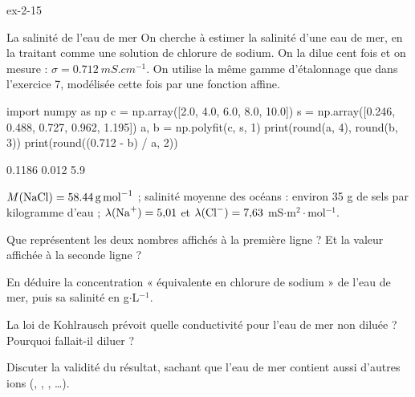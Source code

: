 \begin{blocLivre}{ex-2-15}
\begin{exercice}[3]{La salinité de l'eau de mer}
On cherche à estimer la salinité d'une eau de mer, en la traitant comme une solution de chlorure de sodium.
On la dilue cent fois et on mesure : $\sigma=\qty{0,712}{mS.cm^{-1}}$. On utilise la même gamme d'étalonnage que
dans l'exercice 7, modélisée cette fois par une fonction affine.
\begin{codecote}[0.68]
\begin{pythoncol}
import numpy as np
c = np.array([2.0, 4.0, 6.0, 8.0, 10.0])
s = np.array([0.246, 0.488, 0.727, 0.962, 1.195])
a, b = np.polyfit(c, s, 1)
print(round(a, 4), round(b, 3))
print(round((0.712 - b) / a, 2))
\end{pythoncol}
\cote
\begin{consolecol}
0.1186 0.012
5.9
\end{consolecol}
\end{codecote}
\begin{donnees}
$M(\ce{NaCl})=\qty{58,44}{g.mol^{-1}}$ ; salinité moyenne des océans : environ 35 g de sels par kilogramme d'eau ;
$\lambda(\ce{Na+})=5{,}01$ et $\lambda(\ce{Cl-})=7{,}63$ mS$\cdot$m$^2\cdot$mol$^{-1}$.
\end{donnees}
\begin{questions}
\item {}Que représentent les deux nombres affichés à la première ligne ? Et la valeur
affichée à la seconde ligne ?
\item En déduire la concentration « équivalente en chlorure de sodium » de l'eau de mer, puis sa salinité en g$\cdot$L$^{-1}$.
\item La loi de Kohlrausch prévoit quelle conductivité pour l'eau de mer non diluée ? Pourquoi fallait-il diluer ?
\item \initiative Discuter la validité du résultat, sachant que l'eau de mer contient aussi d'autres ions
(, , , …).
\end{questions}
\end{exercice}
\end{blocLivre}
